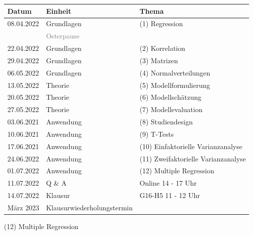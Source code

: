\documentclass[
  8pt,
  ignorenonframetext,
]{beamer}
\begin{document}
\begin{frame}{}
\protect\hypertarget{section-1}{}
\small
\center
\footnotesize
\begin{tabular}{lll}
Datum        & Einheit                       & Thema                                    \\\hline
08.04.2022   & Grundlagen                    & (1) Regression                           \\
             & \textcolor{gray}{Osterpause}                                             \\
22.04.2022   & Grundlagen                    & (2) Korrelation                          \\
29.04.2022   & Grundlagen                    & (3) Matrizen                             \\
06.05.2022   & Grundlagen                    & (4) Normalverteilungen                   \\
13.05.2022   & Theorie                       & (5) Modellformulierung                   \\
20.05.2022   & Theorie                       & (6) Modellschätzung                      \\
27.05.2022   & Theorie                       & (7) Modellevaluation                     \\
03.06.2021   & Anwendung                     & (8) Studiendesign                        \\
10.06.2021   & Anwendung                     & (9) T-Tests                              \\
17.06.2021   & Anwendung                     & (10) Einfaktorielle Varianzanalyse       \\
24.06.2022   & Anwendung                     & (11) Zweifaktorielle Varianzanalyse      \\
01.07.2022   & Anwendung                     & (12) Multiple Regression                 \\
11.07.2022   & Q \& A                        & Online 14 - 17 Uhr                       \\\hline
14.07.2022   & Klausur                       & G16-H5 11 - 12 Uhr                       \\
März 2023    & Klausurwiederholungstermin    &
\end{tabular}
\end{frame}

\begin{frame}[plain]{}
\protect\hypertarget{section-2}{}
\center
\huge
\vfill

\noindent (12) Multiple Regression \vfill
\end{frame}
\end{document}
